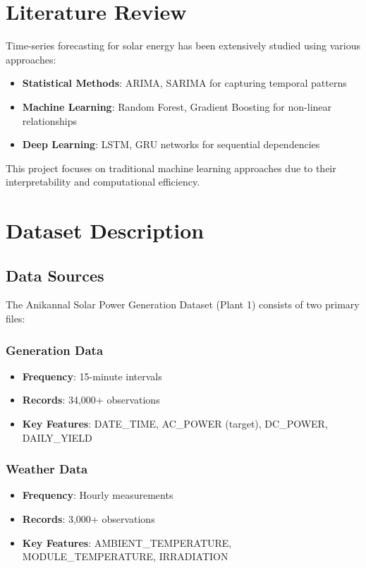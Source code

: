 \documentclass[12pt,a4paper]{article}
\begin{document}
\section{Literature Review}
Time-series forecasting for solar energy has been extensively studied using various approaches:
\begin{itemize}
    \item \textbf{Statistical Methods}: ARIMA, SARIMA for capturing temporal patterns
    \item \textbf{Machine Learning}: Random Forest, Gradient Boosting for non-linear relationships
    \item \textbf{Deep Learning}: LSTM, GRU networks for sequential dependencies
\end{itemize}

This project focuses on traditional machine learning approaches due to their interpretability and computational efficiency.

\section{Dataset Description}

\subsection{Data Sources}
The Anikannal Solar Power Generation Dataset (Plant 1) consists of two primary files:

\subsubsection{Generation Data}
\begin{itemize}
    \item \textbf{Frequency}: 15-minute intervals
    \item \textbf{Records}: 34,000+ observations
    \item \textbf{Key Features}: DATE\_TIME, AC\_POWER (target), DC\_POWER, DAILY\_YIELD
\end{itemize}

\subsubsection{Weather Data}
\begin{itemize}
    \item \textbf{Frequency}: Hourly measurements
    \item \textbf{Records}: 3,000+ observations
    \item \textbf{Key Features}: AMBIENT\_TEMPERATURE, MODULE\_TEMPERATURE, IRRADIATION
\end{itemize}
\end{document}
